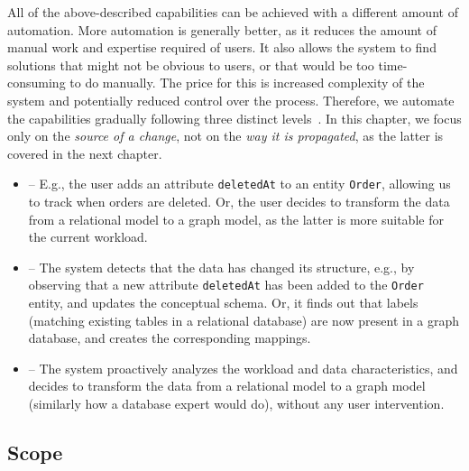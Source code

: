 All of the above-described capabilities can be achieved with a different amount of automation. More automation is generally better, as it reduces the amount of manual work and expertise required of users. It also allows the system to find solutions that might not be obvious to users, or that would be too time-consuming to do manually. The price for this is increased complexity of the system and potentially reduced control over the process. Therefore, we automate the capabilities gradually following three distinct levels~\citep{ideas2022vision}. In this chapter, we focus only on the \emph{source of a change}, not on the \emph{way it is propagated}, as the latter is covered in the next chapter.

\begin{itemize}
    \item {} -- E.g., the user adds an attribute \texttt{deletedAt} to an entity \texttt{Order}, allowing us to track when orders are deleted. Or, the user decides to transform the data from a relational model to a graph model, as the latter is more suitable for the current workload.
    \item {} -- The system detects that the data has changed its structure, e.g., by observing that a new attribute \texttt{deletedAt} has been added to the \texttt{Order} entity, and updates the conceptual schema. Or, it finds out that labels (matching existing tables in a relational database) are now present in a graph database, and creates the corresponding mappings.
    \item {} -- The system proactively analyzes the workload and data characteristics, and decides to transform the data from a relational model to a graph model (similarly how a database expert would do), without any user intervention.
\end{itemize}

\subsection{Scope}



